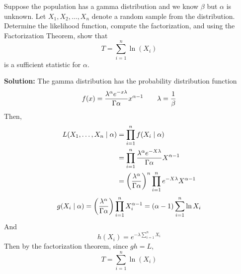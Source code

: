 Suppose the population has a gamma distribution and we know $\beta$ but $\alpha$ is unknown. Let $X_1, X_2, \dots, X_n$ denote a random sample from the distribution. Determine the likelihood function, compute the factorization, and using the Factorization Theorem, show that
$$T = \sum_{i=1}^n \ln (X_i)$$ is a sufficient statistic for $\alpha$.

\nnl \textbf{Solution: } The gamma distribution has the probability distribution function
$$f(x) = \frac{\lambda^{\alpha} e^{-x\lambda}}{\Gamma \alpha}x^{\alpha-1} \qquad \lambda = \over{\beta}$$
Then,
\begin{align*}
L(\thru{X} \mid \alpha) &= \prod_{i=1}^n f(X_i \mid \alpha)\\
&= \prod_{i=1}^n \frac{\lambda^{\alpha} e^{-X\lambda}}{\Gamma \alpha}X^{\alpha-1}\\
&= \pars{\frac{\lambda^{\alpha}}{{\Gamma \alpha}}}^n \prod_{i=1}^n  e^{-X\lambda} X^{\alpha-1}
\end{align*}
$$g(X_i \mid \alpha) = \pars{\frac{\lambda^{\alpha}}{{\Gamma \alpha}}} \prod_{i=1}^n X_i^{\alpha-1} = (\alpha-1)\sum_{i=1}^n \ln X_i$$
And
$$h(X_i) = e^{-\lambda \sum_{i=1}^n X_i}$$
Then by the factorization theorem, since $gh = L$,
$$T = \sum_{i=1}^n \ln (X_i)$$